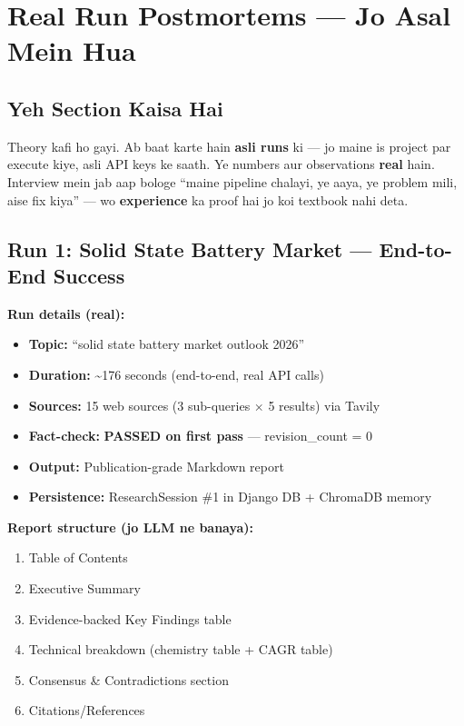\newpage

\section{Real Run Postmortems --- Jo Asal Mein Hua}

\subsection{Yeh Section Kaisa Hai}

\begin{storybox}
Theory kafi ho gayi. Ab baat karte hain \textbf{asli runs} ki --- jo maine is project par execute kiye, asli API keys ke saath. Ye numbers aur observations \textbf{real} hain. Interview mein jab aap bologe ``maine pipeline chalayi, ye aaya, ye problem mili, aise fix kiya'' --- wo \textbf{experience} ka proof hai jo koi textbook nahi deta.
\end{storybox}

\subsection{Run 1: Solid State Battery Market --- End-to-End Success}

\begin{codestorybox}
\textbf{Run details (real):}
\begin{itemize}
\item \textbf{Topic:} ``solid state battery market outlook 2026''
\item \textbf{Duration:} \textasciitilde176 seconds (end-to-end, real API calls)
\item \textbf{Sources:} 15 web sources (3 sub-queries $\times$ 5 results) via Tavily
\item \textbf{Fact-check:} \textbf{PASSED on first pass} --- revision\_count = 0
\item \textbf{Output:} Publication-grade Markdown report
\item \textbf{Persistence:} ResearchSession \#1 in Django DB + ChromaDB memory
\end{itemize}

\textbf{Report structure (jo LLM ne banaya):}
\begin{enumerate}[label=\arabic*.]
\item Table of Contents
\item Executive Summary
\item Evidence-backed Key Findings table
\item Technical breakdown (chemistry table + CAGR table)
\item Consensus \& Contradictions section
\item Citations/References
\end{enumerate}
\end{codestorybox}

